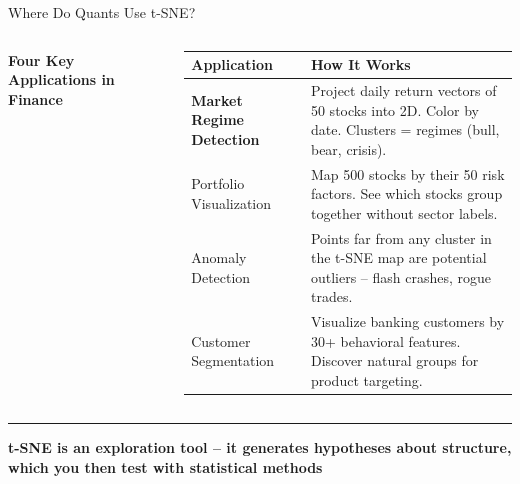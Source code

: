 \documentclass[8pt,aspectratio=169]{beamer}
\newcommand{\bottomnote}[1]{%
\vfill
\vspace{-2mm}
\textcolor{mllavender2}{\rule{\textwidth}{0.4pt}}
\vspace{1mm}
\footnotesize
\textbf{#1}
}
\newcommand{\highlight}[1]{\textcolor{mlorange}{\textbf{#1}}}
\begin{document}
\begin{frame}[t]{Where Do Quants Use t-SNE?}
\begin{columns}[T]
\small
\textbf{Four Key Applications in Finance}

\vspace{2mm}
\footnotesize
\begin{tabular}{@{}l p{9.5cm}@{}}
\toprule
\textbf{Application} & \textbf{How It Works} \\
\midrule
\rowcolor{mllavender4}
\highlight{Market Regime Detection} & Project daily return vectors of 50 stocks into 2D. Color by date. Clusters = regimes (bull, bear, crisis). \\
Portfolio Visualization & Map 500 stocks by their 50 risk factors. See which stocks group together without sector labels. \\
\rowcolor{mllavender4}
Anomaly Detection & Points far from any cluster in the t-SNE map are potential outliers -- flash crashes, rogue trades. \\
Customer Segmentation & Visualize banking customers by 30+ behavioral features. Discover natural groups for product targeting. \\
\bottomrule
\end{tabular}
\end{columns}

\bottomnote{t-SNE is an exploration tool -- it generates hypotheses about structure, which you then test with statistical methods}
\end{frame}
\end{document}
